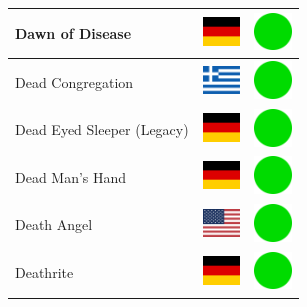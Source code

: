 \documentclass[12pt, a4paper, twoside]{report}
\begin{document}
\begin{center}
\begin{longtable}{|p{5cm}|p{2cm}|p{2cm}|}
Dawn of Disease & \includegraphics[width=1cm]{4x3/de} & \includegraphics[width=1cm]{likes/y} \\ \hline
Dead Congregation & \includegraphics[width=1cm]{4x3/gr} & \includegraphics[width=1cm]{likes/y} \\ \hline
Dead Eyed Sleeper (Legacy) & \includegraphics[width=1cm]{4x3/de} & \includegraphics[width=1cm]{likes/y} \\ \hline
Dead Man's Hand & \includegraphics[width=1cm]{4x3/de} & \includegraphics[width=1cm]{likes/y} \\ \hline
Death Angel & \includegraphics[width=1cm]{4x3/us} & \includegraphics[width=1cm]{likes/y} \\ \hline
Deathrite & \includegraphics[width=1cm]{4x3/de} & \includegraphics[width=1cm]{likes/y} \\ \hline

\end{longtable}
\end{center}
\end{document}
